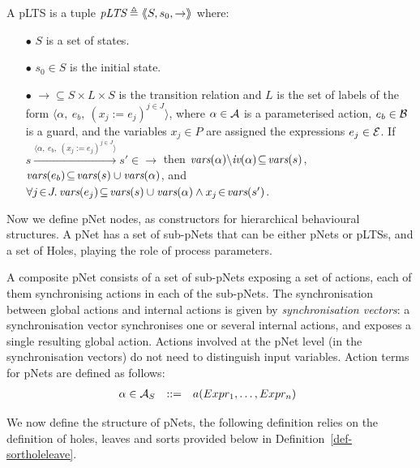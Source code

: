 \documentclass{lncs/llncs}
\begin{document}
\begin{definition}[pLTS]
\label{pLTS}
A pLTS is a tuple
$\pLTS\triangleq\mylangle S,s_0, \to\myrangle$ where:
\begin{itemize}
\item[$\bullet$]
$S$ is a set of states.
\item[$\bullet$]
$s_0 \in S$ is the initial state.
\item[$\bullet$] $\to \subseteq S \times L \times S$ is the transition relation and 
$L$ is the set of labels of the form
$\langle \alpha,~e_b,~(x_j\!:= {e}_j)^{j\in J}\rangle$,
where $\alpha \in\mathcal{A}$ is a parameterised action, $e_b \in
\mathcal{B}$ is a guard, and the variables $x_j\in P$
are assigned the expressions $e_j\in \mathcal{E}$.
If 
$s \xrightarrow{\langle \alpha,~e_b,~(x_j\!:= {e}_j)^{j\in
		J}\rangle} s'\in \to $ then 
		$\vars(\alpha)\backslash \iv(\alpha)\!\subseteq\! \vars(s)$, 
		$\vars(e_b)\!\subseteq\! \vars(s)\cup\vars(\alpha)$, and
		$\forall j\!\in\! J .\,\vars(e_j)\!\subseteq\! \vars(s)\cup\vars(\alpha)\land 
		x_j\!\in\!\vars(s')$. %
\end{itemize}
\end{definition}

Now we define
pNet nodes, as constructors for hierarchical behavioural structures.
A pNet has a set of sub-pNets that can be either pNets or pLTSs, and a
set of Holes, playing the role of process parameters.

A composite pNet consists of a set of sub-pNets exposing
a set of actions, each of them synchronising actions in each of
the sub-pNets. The synchronisation between global actions and
internal actions is given by  \emph{synchronisation vectors}: a
synchronisation vector synchronises one or several internal actions, and
exposes a single resulting global action.
Actions involved at the pNet level (in the synchronisation vectors) do
not need to distinguish  input 
variables. Action terms for pNets are defined as follows:
\[\begin{array}[l]{rcl@{\quad}l}
  \alpha\in \AlgAS &::=&a(Expr_1,\ldots,Expr_n)
\end{array}
\]

We now define the structure of pNets, the following definition relies on the definition 
of holes, leaves and sorts provided below in Definition~\ref{def-sortholeleave}.
\end{document}
